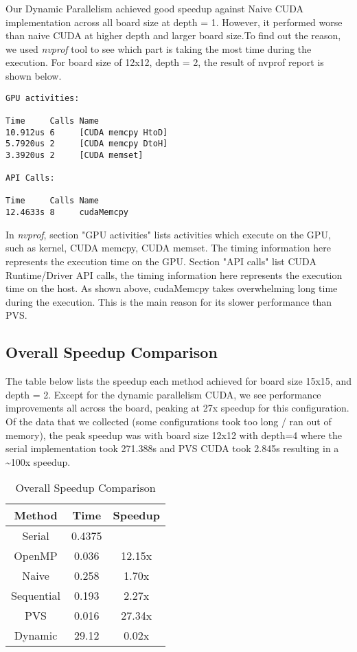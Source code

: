 \noindent
Our Dynamic Parallelism achieved good speedup against Naive CUDA implementation across all board size at depth = 1. However, it performed worse than naive CUDA at higher depth and larger board size.To find out the reason, we used \textit{nvprof} tool to see which part is taking the most time during the execution. For board size of 12x12, depth = 2, the result of nvprof report is shown below.\\

\begin{verbatim}
GPU activities:

Time     Calls Name
10.912us 6     [CUDA memcpy HtoD]
5.7920us 2     [CUDA memcpy DtoH]
3.3920us 2     [CUDA memset]

API Calls:

Time     Calls Name
12.4633s 8     cudaMemcpy
\end{verbatim}

\noindent
In \textit{nvprof}, section "GPU activities" lists activities which execute on the GPU, such as kernel, CUDA memcpy, CUDA memset. The timing information here represents the execution time on the GPU. Section "API calls" list CUDA Runtime/Driver API calls, the timing information here represents the execution time on the host. As shown above, cudaMemcpy takes overwhelming long time during the execution. This is the main reason for its slower performance than PVS.

\subsection{Overall Speedup Comparison}
The table below lists the speedup each method achieved for board size 15x15, and depth = 2. Except for the dynamic parallelism CUDA, we see performance improvements all across the board, peaking at 27x speedup for this configuration. Of the data that we collected (some configurations took too long / ran out of memory), the peak speedup was with board size 12x12 with depth=4 where the serial implementation took 271.388s and PVS CUDA took 2.845s resulting in a \textasciitilde{100}x speedup. 

\begin{table}[!htbp]
\begin{tabular}{|c|c|c|}
\hline
\textbf{Method} & \textbf{Time} & \textbf{Speedup} \\ \hline
Serial          & 0.4375        &                  \\ \hline
OpenMP          & 0.036         & 12.15x           \\ \hline
Naive           & 0.258         & 1.70x            \\ \hline
Sequential      & 0.193         & 2.27x            \\ \hline
PVS             & 0.016         & 27.34x           \\ \hline
Dynamic         & 29.12         & 0.02x            \\ \hline
\end{tabular}
\caption{Overall Speedup Comparison}
\end{table}


